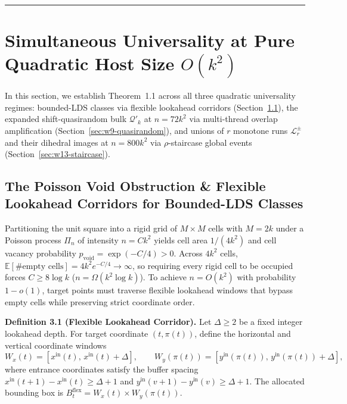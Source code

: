 \documentclass[
  11pt,
]{article}
\begin{document}
\begin{center}\rule{0.5\linewidth}{0.5pt}\end{center}

\section{\texorpdfstring{Simultaneous Universality at Pure Quadratic Host Size \(O(k^2)\)}{Simultaneous Universality at Pure Quadratic Host Size O(k\^{}2)}}\label{sec:universality}

In this section, we establish Theorem~1.1 across all three quadratic universality regimes: bounded-LDS classes via flexible lookahead corridors (Section~\ref{sec:lookahead-bounded-lds}), the expanded shift-quasirandom bulk \(\mathcal{Q}'_k\) at \(n = 72 k^2\) via multi-thread overlap amplification (Section~\ref{sec:w9-quasirandom}), and unions of \(r\) monotone runs \(\mathcal{L}^\pm_r\) and their dihedral images at \(n = 800 k^2\) via \(\rho\)-staircase global events (Section~\ref{sec:w13-staircase}).

\subsection{The Poisson Void Obstruction \& Flexible Lookahead Corridors for Bounded-LDS Classes}\label{sec:lookahead-bounded-lds}

Partitioning the unit square into a rigid grid of \(M \times M\) cells with \(M = 2k\) under a Poisson process \(\Pi_n\) of intensity \(n = C k^2\) yields cell area \(1/(4k^2)\) and cell vacancy probability \(p_{\mathrm{void}} = \exp(-C/4) > 0\). Across \(4k^2\) cells, \(\mathbb{E}[\# \text{empty cells}] = 4k^2 e^{-C/4} \to \infty\), so requiring every rigid cell to be occupied forces \(C \ge 8 \log k\) (\(n = \Omega(k^2 \log k)\)). To achieve \(n = O(k^2)\) with probability \(1 - o(1)\), target points must traverse flexible lookahead windows that bypass empty cells while preserving strict coordinate order.

\textbf{Definition 3.1 (Flexible Lookahead Corridor).} Let \(\Delta \ge 2\) be a fixed integer lookahead depth. For target coordinate \((t, \pi(t))\), define the horizontal and vertical coordinate windows
\[
W_x(t) = [x^{\mathrm{in}}(t), \, x^{\mathrm{in}}(t) + \Delta], \qquad W_y(\pi(t)) = [y^{\mathrm{in}}(\pi(t)), \, y^{\mathrm{in}}(\pi(t)) + \Delta],
\]
where entrance coordinates satisfy the buffer spacing \(x^{\mathrm{in}}(t+1) - x^{\mathrm{in}}(t) \ge \Delta + 1\) and \(y^{\mathrm{in}}(v+1) - y^{\mathrm{in}}(v) \ge \Delta + 1\). The allocated bounding box is \(B_t^{\mathrm{flex}} = W_x(t) \times W_y(\pi(t))\).
\end{document}
